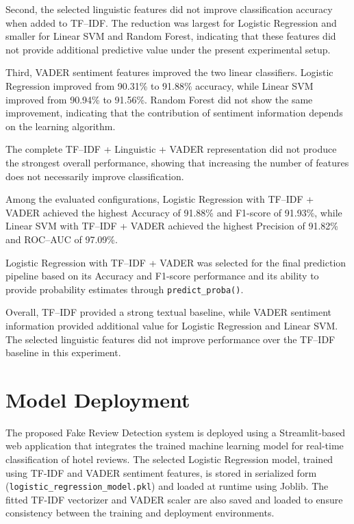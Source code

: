 \documentclass[12pt,a4paper]{report}
\begin{document}
Second, the selected linguistic features did not improve
classification accuracy when added to TF--IDF. The reduction was
largest for Logistic Regression and smaller for Linear SVM and Random
Forest, indicating that these features did not provide additional
predictive value under the present experimental setup.

Third, VADER sentiment features improved the two linear classifiers.
Logistic Regression improved from 90.31\% to 91.88\% accuracy, while
Linear SVM improved from 90.94\% to 91.56\%. Random Forest did not
show the same improvement, indicating that the contribution of
sentiment information depends on the learning algorithm.

The complete TF--IDF + Linguistic + VADER representation did not
produce the strongest overall performance, showing that increasing
the number of features does not necessarily improve classification.

Among the evaluated configurations, Logistic Regression with
TF--IDF + VADER achieved the highest Accuracy of 91.88\% and F1-score
of 91.93\%, while Linear SVM with TF--IDF + VADER achieved the highest
Precision of 91.82\% and ROC--AUC of 97.09\%.

Logistic Regression with TF--IDF + VADER was selected for the final
prediction pipeline based on its Accuracy and F1-score performance and
its ability to provide probability estimates through
\texttt{predict\_proba()}.

Overall, TF--IDF provided a strong textual baseline, while VADER
sentiment information provided additional value for Logistic
Regression and Linear SVM. The selected linguistic features did not
improve performance over the TF--IDF baseline in this experiment.

\newpage

\chapter{Model Deployment}

The proposed Fake Review Detection system is deployed using a
Streamlit-based web application that integrates the trained machine
learning model for real-time classification of hotel reviews.
The selected Logistic Regression model, trained using TF-IDF
and VADER sentiment features, is stored in serialized form
(\texttt{logistic\_regression\_model.pkl}) and loaded at runtime
using Joblib. The fitted TF-IDF vectorizer and VADER scaler
are also saved and loaded to ensure consistency between
the training and deployment environments.
\end{document}
